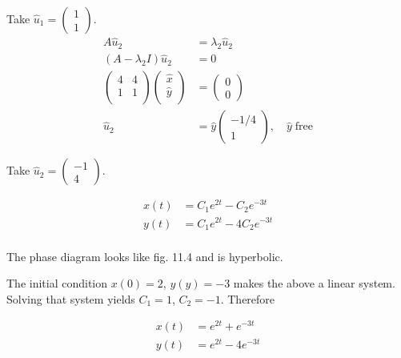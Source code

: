 \documentclass[12pt,twoside]{article}
\begin{document}
Take $\hat{u}_1=\begin{pmatrix} 1 \\ 1 \end{pmatrix}$.
\begin{equation}
  \begin{aligned}
    A\hat{u}_2 &= \lambda_2\hat{u}_2 \\
    (A-\lambda_2I)\hat{u}_2 &= 0 \\
    \begin{pmatrix}
      4 & 4 \\ 1 & 1 \\
    \end{pmatrix}
    \begin{pmatrix}
      \hat{x} \\ \hat{y} \\
    \end{pmatrix} &=
    \begin{pmatrix}
      0 \\ 0
    \end{pmatrix} \\
    \hat{u}_2 &= \hat{y}
    \begin{pmatrix}
      -1/4 \\ 1
    \end{pmatrix}, \quad \hat{y}\;\text{free}
  \end{aligned}
\end{equation}

Take $\hat{u}_2=\begin{pmatrix} -1 \\ 4 \end{pmatrix}$.

\begin{equation}
  \begin{aligned}
    x(t) &= C_1e^{2t}-C_2e^{-3t} \\
    y(t) &= C_1e^{2t}-4C_2e^{-3t} \\
  \end{aligned}
\end{equation}

The phase diagram looks like fig. 11.4 and is hyperbolic.

The initial condition $x(0)=2$, $y(y)=-3$ makes the above a linear system.
Solving that system yields $C_1=1$, $C_2=-1$. Therefore

\begin{equation}
  \begin{aligned}
    x(t) &= e^{2t}+e^{-3t} \\
    y(t) &= e^{2t}-4e^{-3t} \\
  \end{aligned}
\end{equation}
\end{document}
